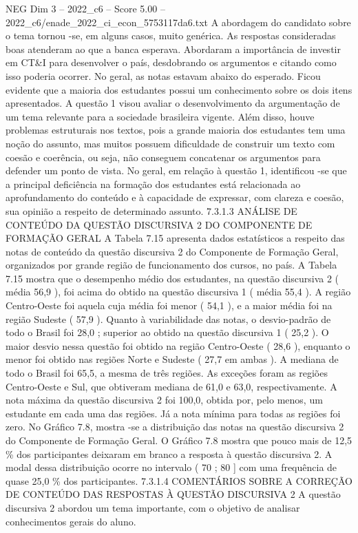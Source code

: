\begin{textsample}{NEG Dim 3 – 2022\_c6 – Score 5.00 – 2022\_c6/enade\_2022\_ci\_econ\_5753117da6.txt}
A abordagem do candidato sobre o tema tornou -se, em alguns casos, muito genérica.
As respostas consideradas boas atenderam ao que a banca esperava.
Abordaram a importância de investir em CT\&I para desenvolver o país, desdobrando os argumentos e citando como isso poderia ocorrer.
No geral, as notas estavam abaixo do esperado.
Ficou evidente que a maioria dos estudantes possui um conhecimento sobre os dois itens apresentados.
A questão 1 visou avaliar o desenvolvimento da argumentação de um tema relevante para a sociedade brasileira vigente.
Além disso, houve problemas estruturais nos textos, pois a grande maioria dos estudantes tem uma noção do assunto, mas muitos possuem dificuldade de construir um texto com coesão e coerência, ou seja, não conseguem concatenar os argumentos para defender um ponto de vista.
No geral, em relação à questão 1, identificou -se que a principal deficiência na formação dos estudantes está relacionada ao aprofundamento do conteúdo e à capacidade de expressar, com clareza e coesão, sua opinião a respeito de determinado assunto. 7.3.1.3 ANÁLISE DE CONTEÚDO DA QUESTÃO DISCURSIVA 2 DO COMPONENTE DE FORMAÇÃO GERAL A Tabela 7.15 apresenta dados estatísticos a respeito das notas de conteúdo da questão discursiva 2 do Componente de Formação Geral, organizados por grande região de funcionamento dos cursos, no país.
A Tabela 7.15 mostra que o desempenho médio dos estudantes, na questão discursiva 2 ( média 56,9 ), foi acima do obtido na questão discursiva 1 ( média 55,4 ).
A região Centro-Oeste foi aquela cuja média foi menor ( 54,1 ), e a maior média foi na região Sudeste ( 57,9 ).
Quanto à variabilidade das notas, o desvio-padrão de todo o Brasil foi 28,0 ; superior ao obtido na questão discursiva 1 ( 25,2 ).
O maior desvio nessa questão foi obtido na região Centro-Oeste ( 28,6 ), enquanto o menor foi obtido nas regiões Norte e Sudeste ( 27,7 em ambas ).
A mediana de todo o Brasil foi 65,5, a mesma de três regiões.
As exceções foram as regiões Centro-Oeste e Sul, que obtiveram mediana de 61,0 e 63,0, respectivamente.
A nota máxima da questão discursiva 2 foi 100,0, obtida por, pelo menos, um estudante em cada uma das regiões.
Já a nota mínima para todas as regiões foi zero.
No Gráfico 7.8, mostra -se a distribuição das notas na questão discursiva 2 do Componente de Formação Geral.
O Gráfico 7.8 mostra que pouco mais de 12,5 \% dos participantes deixaram em branco a resposta à questão discursiva 2.
A modal dessa distribuição ocorre no intervalo ( 70 ; 80 ] com uma frequência de quase 25,0 \% dos participantes. 7.3.1.4 COMENTÁRIOS SOBRE A CORREÇÃO DE CONTEÚDO DAS RESPOSTAS À QUESTÃO DISCURSIVA 2 A questão discursiva 2 abordou um tema importante, com o objetivo de analisar conhecimentos gerais do aluno.

\end{textsample}
